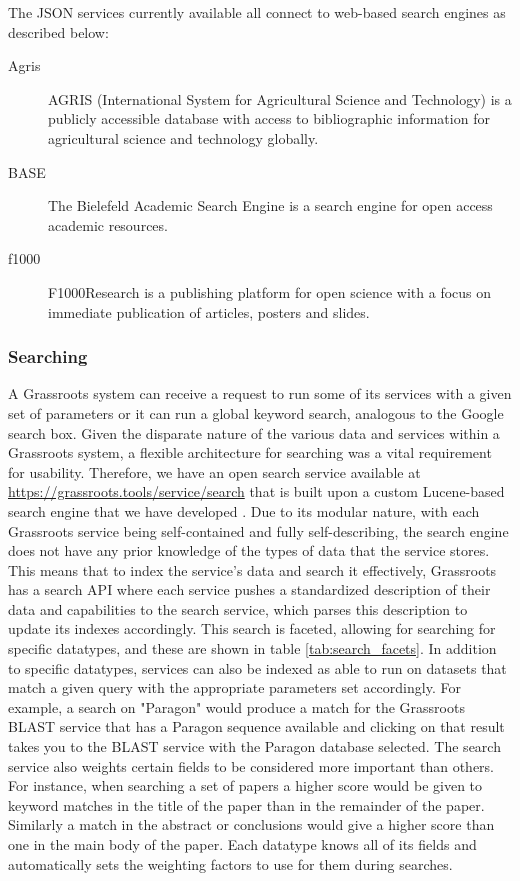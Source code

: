 \documentclass[12pt,a4paper]{extarticle}
\begin{document}
The JSON services currently available all connect to web-based search engines as described below:

\begin{description}
\item [Agris] AGRIS\cite{Agris} (International System for Agricultural Science and Technology) is a publicly accessible database with access to bibliographic information for agricultural science and technology globally.
\item [BASE] The Bielefeld Academic Search Engine\cite{Pieper2015} is a search engine for open access academic resources.
\item [f1000] F1000Research\cite{f1000} is a publishing platform for open science with a focus on immediate publication of articles, posters and slides.
\end{description}


\subsubsection*{Searching}

A Grassroots system can receive a request to run some of its services with a given set of parameters or it can run a global keyword search, analogous to the Google search box. 
Given the disparate nature of the various data and services within a Grassroots system, a flexible architecture for searching was a vital requirement for usability. 
Therefore, we have an open search service \cite {grassroots_search} available at \href{https://grassroots.tools/service/search}{https://grassroots.tools/service/search} that is built upon a custom Lucene-based \cite {lucene} search engine that we have developed \cite {grassroots_lucene}. 
Due to its modular nature, with each Grassroots service being self-contained and fully self-describing, the search engine does not have any prior knowledge of the types of data that the service stores. 
This means that to index the service's data and search it effectively, Grassroots has a search API where each service pushes a standardized description of their data and capabilities to the search service, which parses this description to update its indexes accordingly.
This search is faceted, allowing for searching for specific datatypes, and these are shown in table \ref{tab:search_facets}. 
In addition to specific datatypes, services can also be indexed as able to run on datasets that match a given query with the appropriate parameters set accordingly.
For example, a search on "Paragon" would produce a match for the Grassroots BLAST service that has a Paragon sequence available and clicking on that result takes you to the BLAST service with the Paragon database selected.
The search service also weights certain fields to be considered more important than others.
For instance, when searching a set of papers a higher score would be given to keyword matches in the title of the paper than in the remainder of the paper.
Similarly a match in the abstract or conclusions would give a higher score than one in the main body of the paper.
Each datatype knows all of its fields and automatically sets the weighting factors to use for them during searches.
\end{document}
